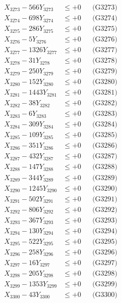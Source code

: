 \documentclass[a4paper,10pt]{article}
\begin{document}
{\begin{align}
X_{3273} - 566Y_{3273} &\leq +0 && \text{(G3273)} \\
X_{3274} - 698Y_{3274} &\leq +0 && \text{(G3274)} \\
X_{3275} - 286Y_{3275} &\leq +0 && \text{(G3275)} \\
X_{3276} - 5Y_{3276} &\leq +0 && \text{(G3276)} \\
X_{3277} - 1326Y_{3277} &\leq +0 && \text{(G3277)} \\
X_{3278} - 31Y_{3278} &\leq +0 && \text{(G3278)} \\
X_{3279} - 250Y_{3279} &\leq +0 && \text{(G3279)} \\
X_{3280} - 152Y_{3280} &\leq +0 && \text{(G3280)} \\
\allowbreak
X_{3281} - 1443Y_{3281} &\leq +0 && \text{(G3281)} \\
X_{3282} - 38Y_{3282} &\leq +0 && \text{(G3282)} \\
X_{3283} - 6Y_{3283} &\leq +0 && \text{(G3283)} \\
X_{3284} - 309Y_{3284} &\leq +0 && \text{(G3284)} \\
X_{3285} - 109Y_{3285} &\leq +0 && \text{(G3285)} \\
X_{3286} - 351Y_{3286} &\leq +0 && \text{(G3286)} \\
X_{3287} - 432Y_{3287} &\leq +0 && \text{(G3287)} \\
X_{3288} - 147Y_{3288} &\leq +0 && \text{(G3288)} \\
X_{3289} - 344Y_{3289} &\leq +0 && \text{(G3289)} \\
X_{3290} - 1245Y_{3290} &\leq +0 && \text{(G3290)} \\
\allowbreak
X_{3291} - 502Y_{3291} &\leq +0 && \text{(G3291)} \\
X_{3292} - 806Y_{3292} &\leq +0 && \text{(G3292)} \\
X_{3293} - 367Y_{3293} &\leq +0 && \text{(G3293)} \\
X_{3294} - 130Y_{3294} &\leq +0 && \text{(G3294)} \\
X_{3295} - 522Y_{3295} &\leq +0 && \text{(G3295)} \\
X_{3296} - 258Y_{3296} &\leq +0 && \text{(G3296)} \\
X_{3297} - 16Y_{3297} &\leq +0 && \text{(G3297)} \\
X_{3298} - 205Y_{3298} &\leq +0 && \text{(G3298)} \\
X_{3299} - 1353Y_{3299} &\leq +0 && \text{(G3299)} \\
X_{3300} - 43Y_{3300} &\leq +0 && \text{(G3300)} \\

\end{align}}
\end{document}
